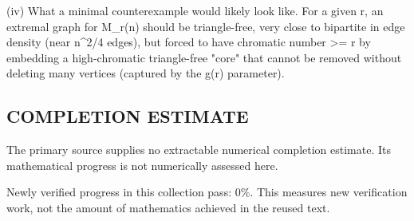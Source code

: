 (iv) What a minimal counterexample would likely look like.
For a given r, an extremal graph for M_r(n) should be triangle-free, very close to bipartite in edge density (near n^2/4 edges), but forced to have chromatic number >= r by embedding a high-chromatic triangle-free "core" that cannot be removed without deleting many vertices (captured by the g(r) parameter).




\subsection*{COMPLETION ESTIMATE}
The primary source supplies no extractable numerical completion estimate. Its mathematical progress is not numerically assessed here.

Newly verified progress in this collection pass: $0\%$. This measures new verification work, not the amount of mathematics achieved in the reused text.
